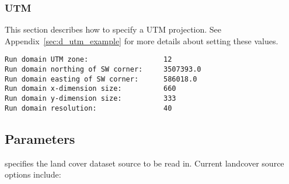  
 
 \subsubsection{UTM} \label{sssec:run_utm}
 This section describes how to specify a UTM
 projection.
 See Appendix~\ref{sec:d_utm_example} for more details about
 setting these values.
 

 \begin{Verbatim}[frame=single]
Run domain UTM zone:                  12
Run domain northing of SW corner:     3507393.0
Run domain easting of SW corner:      586018.0
Run domain x-dimension size:          660
Run domain y-dimension size:          333
Run domain resolution:                40
 \end{Verbatim}
 


 
 \subsection{Parameters} \label{ssec:parameters}
 

 
  specifies the land cover 
 dataset source to be read in.
 Current landcover source options include:

